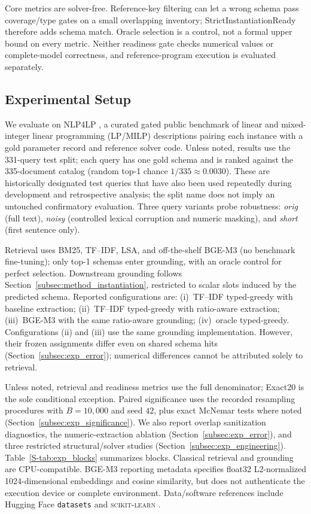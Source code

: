 \documentclass[pdflatex,iicol,sn-basic,Numbered]{sn-jnl}
\begin{document}
Core metrics are solver-free. Reference-key filtering can let a wrong schema pass coverage/type gates on a small overlapping inventory; StrictInstantiationReady therefore adds schema match. Oracle selection is a control, not a formal upper bound on every metric. Neither readiness gate checks numerical values or complete-model correctness, and reference-program execution is evaluated separately.

\subsection{Experimental Setup}
\label{subsec:exp_setup}

We evaluate on \textsc{NLP4LP} \cite{nlp4lp_dataset,ahmaditeshnizi2024optimus_icml}, a curated gated public benchmark of linear and mixed-integer linear programming (LP/MILP) descriptions pairing each instance with a gold parameter record and reference solver code. Unless noted, results use the 331-query test split; each query has one gold schema and is ranked against the 335-document catalog (random top-1 chance $1/335 \approx 0.0030$). These are historically designated test queries that have also been used repeatedly during development and retrospective analysis; the split name does not imply an untouched confirmatory evaluation. Three query variants probe robustness: \emph{orig} (full text), \emph{noisy} (controlled lexical corruption and numeric masking), and \emph{short} (first sentence only).

Retrieval uses BM25, TF--IDF, LSA, and off-the-shelf BGE-M3 (no benchmark fine-tuning); only top-1 schemas enter grounding, with an oracle control for perfect selection. Downstream grounding follows Section~\ref{subsec:method_instantiation}, restricted to scalar slots induced by the predicted schema. Reported configurations are: (i)~TF--IDF typed-greedy with baseline extraction; (ii)~TF--IDF typed-greedy with ratio-aware extraction; (iii)~BGE-M3 with the same ratio-aware grounding; (iv)~oracle typed-greedy. Configurations (ii) and (iii) use the same grounding implementation. However, their frozen assignments differ even on shared schema hits (Section~\ref{subsec:exp_error}); numerical differences cannot be attributed solely to retrieval.

Unless noted, retrieval and readiness metrics use the full denominator; Exact20 is the sole conditional exception. Paired significance uses the recorded resampling procedures with $B=10{,}000$ and seed $42$, plus exact McNemar tests where noted (Section~\ref{subsec:exp_significance}). We also report overlap sanitization diagnostics, the numeric-extraction ablation (Section~\ref{subsec:exp_error}), and three restricted structural/solver studies (Section~\ref{subsec:exp_engineering}). Table~\ref{S-tab:exp_blocks} summarizes blocks. Classical retrieval and grounding are CPU-compatible. BGE-M3 reporting metadata specifies float32 L2-normalized 1024-dimensional embeddings and cosine similarity, but does not authenticate the execution device or complete environment. Data/software references include Hugging Face \texttt{datasets} \cite{lhoest2021datasets} and \textsc{scikit-learn} \cite{pedregosa2011sklearn}.
\end{document}
